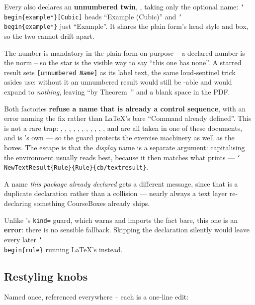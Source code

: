 Every  also declares an \textbf{unnumbered twin},
, taking only the optional name:
\texttt{\char`\\begin\{example*\}[Cubic]} heads ``Example (Cubic)'' and
\texttt{\char`\\begin\{example*\}} just ``Example''. It shares the plain
form's head style and box, so the two cannot drift apart.

The number is mandatory in the plain form on purpose -- a declared number
is the norm -- so the star is the visible way to say ``this one has none''.
A starred result sets \texttt{[unnumbered \emph{Name}]} as its label text,
the same loud-sentinel trick asides use: without it an unnumbered result
would still be -able and  would expand to \emph{nothing},
leaving ``by Theorem~'' and a blank space in the PDF.

Both factories \textbf{refuse a name that is already a control sequence},
with an error naming the fix rather than LaTeX's bare ``Command
 already defined''. This is not a rare trap: ,
, , , , , ,
, , , ,  and
 are all taken in one of these documents, and  is
's own --- so the guard protects the exercise machinery
as well as the boxes. The escape is that the \emph{display} name is a
separate argument: capitalising the environment usually reads best, because
it then matches what prints ---
\texttt{\char`\\NewTextResult\{Rule\}\{Rule\}\{cb/textresult\}}.

A name \emph{this package already declared} gets a different message, since
that is a duplicate declaration rather than a collision --- nearly always a
text layer re-declaring something CourseBoxes already ships.

Unlike 's \texttt{kind=} guard, which warns and imports the
fact bare, this one is an \textbf{error}: there is no sensible fallback.
Skipping the declaration silently would leave every later
\texttt{\char`\\begin\{rule\}} running LaTeX's  instead.

\subsection*{Restyling knobs}

Named once, referenced everywhere -- each is a one-line edit:

